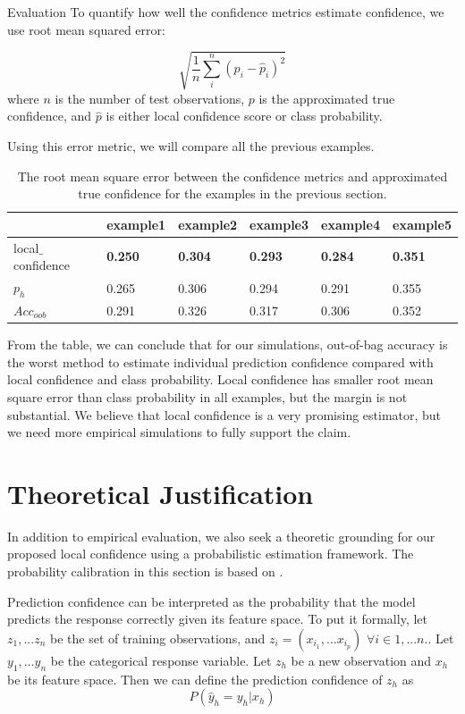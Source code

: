 \documentclass[12pt]{pom_thesis}
\begin{document}
\begin{chapter}{Evaluation}
To quantify how well the confidence metrics estimate confidence, we use root mean squared error:

\begin{equation*}
   \sqrt{ \frac{1}{n}\sum_i^n(p_i-\hat{p}_i)^2}
\end{equation*}
where $n$ is the number of test observations, $p$ is the approximated true confidence, and $\hat{p}$ is either local confidence score or class probability.

Using this error metric, we will compare all the previous examples.

\begin{table}[h]
\begin{tabular}{|l|l|l|l|l|l|}
\hline
                    & example1 & example2 & example3 & example4 & example5 \\
                    \hline
local$\_$confidence    & \textbf{0.250}   & \textbf{0.304}   & \textbf{0.293}   & \textbf{0.284}    & \textbf{0.351}   \\
$p_h$    & 0.265   & 0.306   & 0.294     & 0.291     & 0.355   \\
$Acc_{oob}$ & 0.291   & 0.326   & 0.317     & 0.306     & 0.352  \\
\hline
\end{tabular}
\label{error-table}
\caption{The root mean square error between the confidence metrics and approximated true confidence for the examples in the previous section.}
\end{table}

From the table, we can conclude that for our simulations, out-of-bag accuracy is the worst method to estimate individual prediction confidence compared with local confidence and class probability. Local confidence has smaller root mean square error than class probability in all examples, but the margin is not substantial. We believe that local confidence is a very promising estimator, but we need more empirical simulations to fully support the claim.


\section{Theoretical Justification}
In addition to empirical evaluation, we also seek a theoretic grounding for our proposed local confidence using a probabilistic estimation framework. The probability calibration in this section is based on \cite{Olson}. 

Prediction confidence can be interpreted as the probability that the model predicts the response correctly given its feature space. 
To put it formally, let $z_1,...z_n$ be the set of training observations, and $z_i = (x_{i_1},...x_{i_p})$ $\forall i \in 1,...n.$. Let $y_1,...y_n$ be the categorical response variable. Let $z_h$ be a new observation and $x_h$ be its feature space. Then we can define the prediction confidence of $z_h$ as 
$$P(\hat{y}_h=y_h|x_h)$$


\end{chapter}
\end{document}

